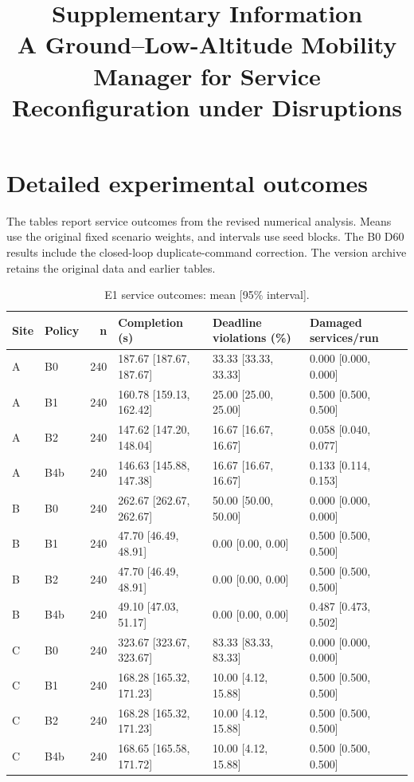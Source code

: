\documentclass[11pt,a4paper]{article}
\title{Supplementary Information\\[8pt]\large A Ground--Low-Altitude Mobility Manager for Service Reconfiguration under Disruptions}
\author{}
\date{}
\begin{document}
\maketitle
\section{Detailed experimental outcomes}

The tables report service outcomes from the revised numerical analysis. Means use the original fixed scenario weights, and intervals use seed blocks. The B0 D60 results include the closed-loop duplicate-command correction. The version archive retains the original data and earlier tables.

\begin{table}[H]
\centering
\small
\setlength{\tabcolsep}{3pt}
\caption{E1 service outcomes: mean [95\% interval].}
\label{tab:S1}
\begin{tabularx}{\textwidth}{@{}llrYYY@{}}
\toprule
Site & Policy & n & Completion (s) & Deadline violations (\%) & Damaged services/run \\
\midrule
A & B0 & 240 & 187.67 [187.67, 187.67] & 33.33 [33.33, 33.33] & 0.000 [0.000, 0.000] \\
A & B1 & 240 & 160.78 [159.13, 162.42] & 25.00 [25.00, 25.00] & 0.500 [0.500, 0.500] \\
A & B2 & 240 & 147.62 [147.20, 148.04] & 16.67 [16.67, 16.67] & 0.058 [0.040, 0.077] \\
A & B4b & 240 & 146.63 [145.88, 147.38] & 16.67 [16.67, 16.67] & 0.133 [0.114, 0.153] \\
B & B0 & 240 & 262.67 [262.67, 262.67] & 50.00 [50.00, 50.00] & 0.000 [0.000, 0.000] \\
B & B1 & 240 & 47.70 [46.49, 48.91] & 0.00 [0.00, 0.00] & 0.500 [0.500, 0.500] \\
B & B2 & 240 & 47.70 [46.49, 48.91] & 0.00 [0.00, 0.00] & 0.500 [0.500, 0.500] \\
B & B4b & 240 & 49.10 [47.03, 51.17] & 0.00 [0.00, 0.00] & 0.487 [0.473, 0.502] \\
C & B0 & 240 & 323.67 [323.67, 323.67] & 83.33 [83.33, 83.33] & 0.000 [0.000, 0.000] \\
C & B1 & 240 & 168.28 [165.32, 171.23] & 10.00 [4.12, 15.88] & 0.500 [0.500, 0.500] \\
C & B2 & 240 & 168.28 [165.32, 171.23] & 10.00 [4.12, 15.88] & 0.500 [0.500, 0.500] \\
C & B4b & 240 & 168.65 [165.58, 171.72] & 10.00 [4.12, 15.88] & 0.500 [0.500, 0.500] \\
\bottomrule
\end{tabularx}
\end{table}
\end{document}
